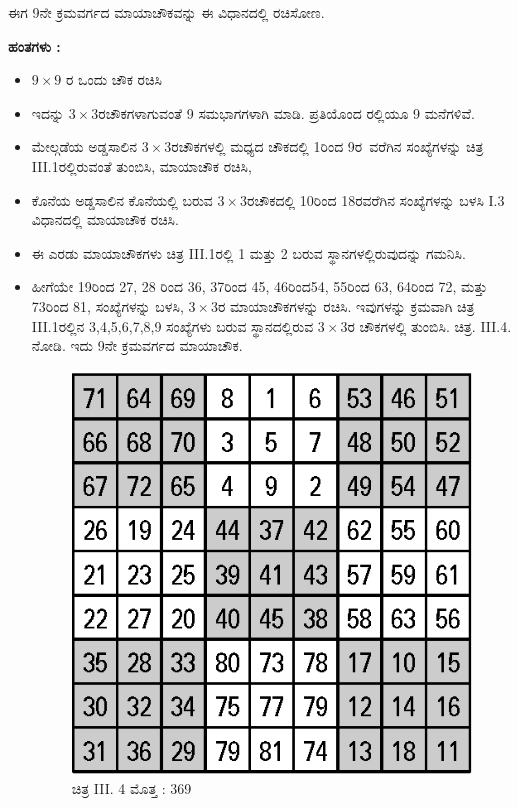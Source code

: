 ಈಗ 9ನೇ ಕ್ರಮವರ್ಗದ ಮಾಯಾಚೌಕವನ್ನು ಈ ವಿಧಾನದಲ್ಲಿ ರಚಿಸೋಣ.

\noindent \textbf{ಹಂತಗಳು :}
\begin{itemize}
	\item $9 \times 9$ ರ ಒಂದು ಚೌಕ ರಚಿಸಿ
	\item ಇದನ್ನು $3 \times 3$ರಚೌಕಗಳಾಗುವಂತೆ 9 ಸಮಭಾಗಗಳಾಗಿ ಮಾಡಿ. ಪ್ರತಿಯೊಂದ ರಲ್ಲಿಯೂ 9 ಮನೆಗಳಿವೆ.
	\item ಮೇಲ್ಗಡೆಯ ಅಡ್ಡಸಾಲಿನ $3 \times 3$ರಚೌಕಗಳಲ್ಲಿ ಮಧ್ಯದ ಚೌಕದಲ್ಲಿ 1ರಿಂದ \hbox{9ರ ವರೆಗಿನ} ಸಂಖ್ಯೆಗಳನ್ನು ಚಿತ್ರ III.1ರಲ್ಲಿರುವಂತೆ ತುಂಬಿಸಿ, ಮಾಯಾಚೌಕ ರಚಿಸಿ,
	\item ಕೊನೆಯ ಅಡ್ಡಸಾಲಿನ ಕೊನೆಯಲ್ಲಿ ಬರುವ $3 \times 3$ರಚೌಕದಲ್ಲಿ 10ರಿಂದ 18ರವರೆಗಿನ ಸಂಖ್ಯೆಗಳನ್ನು ಬಳಸಿ I.3 ವಿಧಾನದಲ್ಲಿ ಮಾಯಾಚೌಕ ರಚಿಸಿ.
	\item ಈ ಎರಡು ಮಾಯಾಚೌಕಗಳು ಚಿತ್ರ III.1ರಲ್ಲಿ 1 ಮತ್ತು 2 ಬರುವ ಸ್ಥಾನಗಳ\-ಲ್ಲಿರುವುದನ್ನು ಗಮನಿಸಿ.
	\item ಹೀಗೆಯೇ 19ರಿಂದ 27, 28 ರಿಂದ 36, 37ರಿಂದ 45, 46ರಿಂದ54, 55ರಿಂದ 63, 64ರಿಂದ 72, ಮತ್ತು 73ರಿಂದ 81, ಸಂಖ್ಯೆಗಳನ್ನು ಬಳಸಿ, $3 \times 3$ರ ಮಾಯಾಚೌಕ\-ಗಳನ್ನು 
	ರಚಿಸಿ. ಇವುಗಳನ್ನು ಕ್ರಮವಾಗಿ ಚಿತ್ರ III.1ರಲ್ಲಿನ 3,4,5,6,7,8,9 ಸಂಖ್ಯೆ\-ಗಳು ಬರುವ ಸ್ಥಾನದಲ್ಲಿರುವ $3 \times 3$ರ ಚೌಕಗಳಲ್ಲಿ ತುಂಬಿಸಿ. ಚಿತ್ರ. III.4. ನೋಡಿ. ಇದು 9ನೇ ಕ್ರಮವರ್ಗದ ಮಾಯಾಚೌಕ.
	\begin{figure}[H]
	\includegraphics[scale=.9]{src/figures/chap3/fig3-31.eps}
	\caption*{ಚಿತ್ರ III. 4 ಮೊತ್ತ : 369}
	\end{figure}
\end{itemize}
